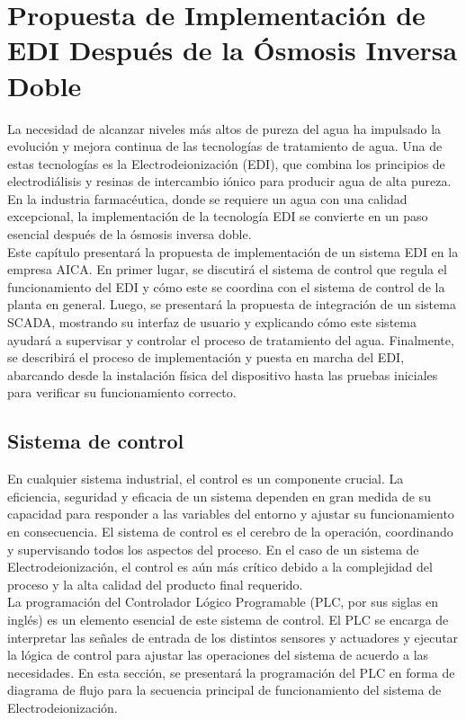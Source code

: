 \chapter{Propuesta de Implementación de EDI Después de la Ósmosis Inversa Doble}
\label{cap:propuesta_implementacion}

La necesidad de alcanzar niveles más altos de pureza del agua ha impulsado
la evolución y mejora continua de las tecnologías de tratamiento de agua.
Una de estas tecnologías es la Electrodeionización (EDI), que combina
los principios de electrodiálisis y resinas de intercambio iónico para
producir agua de alta pureza. En la industria farmacéutica, donde se
requiere un agua con una calidad excepcional, la implementación de la
tecnología EDI se convierte en un paso esencial después de la ósmosis inversa doble.\\

Este capítulo presentará la propuesta de implementación de un sistema
EDI en la empresa AICA. En primer lugar, se discutirá el sistema de
control que regula el funcionamiento del EDI y cómo este se coordina
con el sistema de control de la planta en general.
Luego, se presentará la propuesta de integración de un sistema SCADA,
mostrando su interfaz de usuario y explicando cómo este sistema
ayudará a supervisar y controlar el proceso de tratamiento del agua.
Finalmente, se describirá el proceso de implementación y puesta en marcha del
EDI, abarcando desde la instalación física del dispositivo hasta las pruebas
iniciales para verificar su funcionamiento correcto.

\section{Sistema de control}
\label{sec:sistema_control}

En cualquier sistema industrial, el control es un componente crucial. La eficiencia, seguridad y eficacia de un sistema dependen en gran medida de su capacidad para responder a las variables del entorno y ajustar su funcionamiento en consecuencia. El sistema de control es el cerebro de la operación, coordinando y supervisando todos los aspectos del proceso. En el caso de un sistema de Electrodeionización, el control es aún más crítico debido a la complejidad del proceso y la alta calidad del producto final requerido.\\

La programación del Controlador Lógico Programable (PLC, por sus siglas en inglés) es un elemento esencial de este sistema de control. El PLC se encarga de interpretar las señales de entrada de los distintos sensores y actuadores y ejecutar la lógica de control para ajustar las operaciones del sistema de acuerdo a las necesidades. En esta sección, se presentará la programación del PLC en forma de diagrama de flujo para la secuencia principal de funcionamiento del sistema de Electrodeionización.\\

